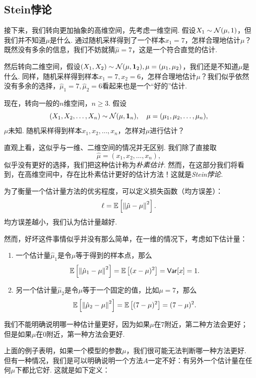 \subsection{Stein悖论}
接下来，我们转向更加抽象的高维空间，先考虑一维空间. 假设$X_1 \sim \mathcal{N}(\mu,1)$，但我们并不知道$\mu$是什么. 通过随机采样得到了一个样本$x_1 = 7$，怎样合理地估计$\mu$？既然没有多余的信息，我们不妨就猜$\hat{\mu} = 7$，这是一个符合直觉的估计. 

然后转向二维空间，假设$(X_1, X_2) \sim \mathcal{N}(\mu,\mathbf{1}_2), \mu=(\mu_1,\mu_2)$，我们还是不知道$\mu$是什么. 同样，随机采样得到样本$x_1 = 7, x_2=6$，怎样合理地估计$\mu$？我们似乎依然没有多余的选择，$\hat{\mu}_1 = 7, \hat{\mu}_2=6$看起来也是一个“好的”估计. 

现在，转向一般的$n$维空间，$n\geq 3$. 假设
\[(X_1,X_2,\dots, X_n) \sim \mathcal{N}(\mu, \mathbf{1}_n),\quad \mu=(\mu_1,\mu_2,\dots,\mu_n),\]
$\mu$未知. 随机采样得到样本$x_1,x_2,\dots,x_n$，怎样对$\mu$进行估计？

直观上看，这似乎与一维、二维空间的情况并无区别. 我们除了直接取
\begin{equation}
    \hat{\mu}=(x_1,x_2,\dots,x_n), \label{eq:naive-estimation}
\end{equation}
似乎没有更好的选择，我们把这种估计称为\textit{朴素估计}. 然而，在这部分我们将看到，在高维空间中，存在比朴素估计更好的估计方法！这就是\textit{Stein悖论}. 

为了衡量一个估计量方法的优劣程度，可以定义损失函数（均方误差）：
\[\ell = \mathbb{E}\left[\left\|\hat{\mu}-\mu\right\|^2\right].\]
均方误差越小，我们认为估计量越好. 

然而，好坏这件事情似乎并没有那么简单，在一维的情况下，考虑如下估计量：
\begin{enumerate}
    \item 一个估计量$\hat\mu_1$是令$\mu$等于得到的样本点，那么
    \[\mathbb{E}\left[\left\|\hat{\mu}_1-\mu\right\|^2\right] = \mathbb{E}\left[(x-\mu)^2\right]=\mathsf{Var}[x]=1.\]
    \item 另一个估计量$\hat\mu_2$是令$\mu$等于一个固定的值，比如$\mu=7$，那么
    \[\mathbb{E}\left[\left\|\hat{\mu}_2-\mu\right\|^2\right] = \mathbb{E}\left[(7-\mu)^2\right]=(7-\mu)^2.\]
\end{enumerate}

我们不能明确说明哪一种估计量更好，因为如果$\mu$在$7$附近，第二种方法会更好；但是如果$\mu$在$0$附近，第一种方法会更好. 

上面的例子表明，如果一个模型的参数$\mu$，我们很可能无法判断哪一种方法更好. 但有一种情况，我们是可以明确说明一个方法$A$一定不好：有另外一个估计量在任何$\mu$下都比它好. 这就是如下定义：

